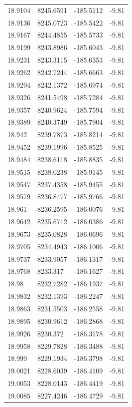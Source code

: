 \begin{table}[H]
\begin{tabular}{llll}
18.9104 & 8245.6591 & -185.5112 & -9.81 \\
18.9136 & 8245.0723 & -185.5422 & -9.81 \\
18.9167 & 8244.4855 & -185.5733 & -9.81 \\
18.9199 & 8243.8986 & -185.6043 & -9.81 \\
18.9231 & 8243.3115 & -185.6353 & -9.81 \\
18.9262 & 8242.7244 & -185.6663 & -9.81 \\
18.9294 & 8242.1372 & -185.6974 & -9.81 \\
18.9326 & 8241.5498 & -185.7284 & -9.81 \\
18.9357 & 8240.9624 & -185.7594 & -9.81 \\
18.9389 & 8240.3749 & -185.7904 & -9.81 \\
18.942 & 8239.7873 & -185.8214 & -9.81 \\
18.9452 & 8239.1996 & -185.8525 & -9.81 \\
18.9484 & 8238.6118 & -185.8835 & -9.81 \\
18.9515 & 8238.0238 & -185.9145 & -9.81 \\
18.9547 & 8237.4358 & -185.9455 & -9.81 \\
18.9579 & 8236.8477 & -185.9766 & -9.81 \\
18.961 & 8236.2595 & -186.0076 & -9.81 \\
18.9642 & 8235.6712 & -186.0386 & -9.81 \\
18.9673 & 8235.0828 & -186.0696 & -9.81 \\
18.9705 & 8234.4943 & -186.1006 & -9.81 \\
18.9737 & 8233.9057 & -186.1317 & -9.81 \\
18.9768 & 8233.317 & -186.1627 & -9.81 \\
18.98 & 8232.7282 & -186.1937 & -9.81 \\
18.9832 & 8232.1393 & -186.2247 & -9.81 \\
18.9863 & 8231.5503 & -186.2558 & -9.81 \\
18.9895 & 8230.9612 & -186.2868 & -9.81 \\
18.9926 & 8230.372 & -186.3178 & -9.81 \\
18.9958 & 8229.7828 & -186.3488 & -9.81 \\
18.999 & 8229.1934 & -186.3798 & -9.81 \\
19.0021 & 8228.6039 & -186.4109 & -9.81 \\
19.0053 & 8228.0143 & -186.4419 & -9.81 \\
19.0085 & 8227.4246 & -186.4729 & -9.81 \\

\end{tabular}
\end{table}
